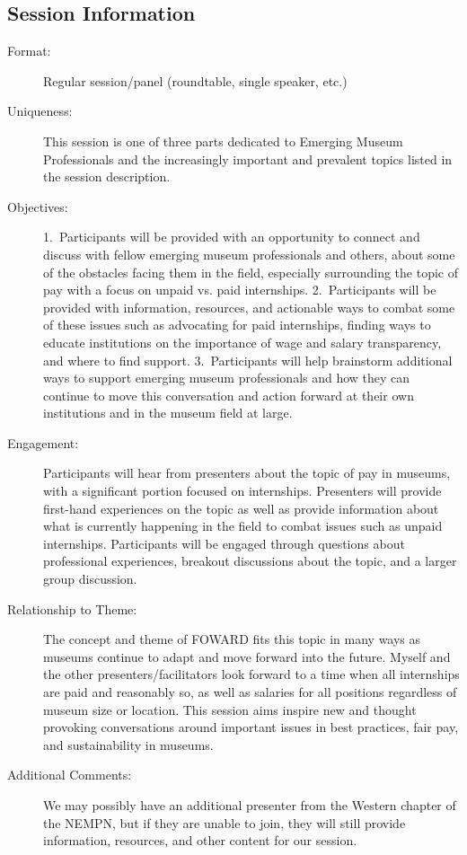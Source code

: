 \documentclass{report}
\begin{document}
              \subsection*{Session Information}
                \begin{description}
                  \item [Format:] Regular session/panel (roundtable, single speaker, etc.)
							    
							    \item [Uniqueness:]This session is one of three parts dedicated to Emerging Museum Professionals and the increasingly important and prevalent topics listed in the session description.
							    \item [Objectives:]1. Participants will be provided with an opportunity to connect and discuss with fellow emerging museum professionals and others, about some of the obstacles facing them in the field, especially surrounding the topic of pay with a focus on unpaid vs. paid internships. 
2. Participants will be provided with information, resources, and actionable ways to combat some of these issues such as advocating for paid internships, finding ways to educate institutions on the importance of wage and salary transparency, and where to find support.
3. Participants will help brainstorm additional ways to support emerging museum professionals and how they can continue to move this conversation and action forward at their own institutions and in the museum field at large.
							    \item [Engagement:]Participants will hear from presenters about the topic of pay in museums, with a significant portion focused on internships. Presenters will provide first-hand experiences on the topic as well as provide information about what is currently happening in the field to combat issues such as unpaid internships. Participants will be engaged through questions about professional experiences, breakout discussions about the topic, and a larger group discussion.
							    \item [Relationship to Theme:]The concept and theme of FOWARD fits this topic in many ways as museums continue to adapt and move forward into the future. Myself and the other presenters/facilitators look forward to a time when all internships are paid and reasonably so, as well as salaries for all positions regardless of museum size or location. This session aims inspire new and thought provoking conversations around important issues in best practices, fair pay, and sustainability in museums.
							    
                    \item [Additional Comments: ]We may possibly have an additional presenter from the Western chapter of the NEMPN, but if they are unable to join, they will still provide information, resources, and other content for our session. 

                \end{description}
\end{document}
